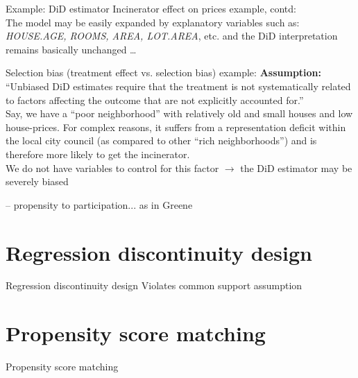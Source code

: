 \documentclass{beamer}
\begin{document}
\begin{frame}{Example: DiD estimator}
\small
Incinerator effect on prices example, contd: \\
\medskip
The model may be easily expanded by explanatory variables such as: \textit{HOUSE.AGE, ROOMS, AREA, LOT.AREA}, etc. and the DiD interpretation remains basically unchanged \dots
\begin{block}{Selection bias (treatment effect vs. selection bias) example:}
\small
\textbf{Assumption:} “Unbiased DiD estimates require that the treatment is not systematically related to factors affecting the outcome that are not explicitly accounted for.”  \\
\medskip
Say, we have a “poor neighborhood” with relatively old and small houses and low house-prices. For complex reasons, it suffers from a representation deficit within the local city council (as compared to other “rich neighborhoods”) and is therefore more likely to get the incinerator. \\
\medskip
We do not have variables to control for this factor $\rightarrow$ the DiD estimator may be severely biased 
\end{block}

-- propensity to participation... as in Greene

\end{frame}
\section{Regression discontinuity design}
\begin{frame}{Regression discontinuity design}
    Violates common support assumption
\end{frame}
\section{Propensity score matching}
\begin{frame}{Propensity score matching}
    
\end{frame}
\end{document}
